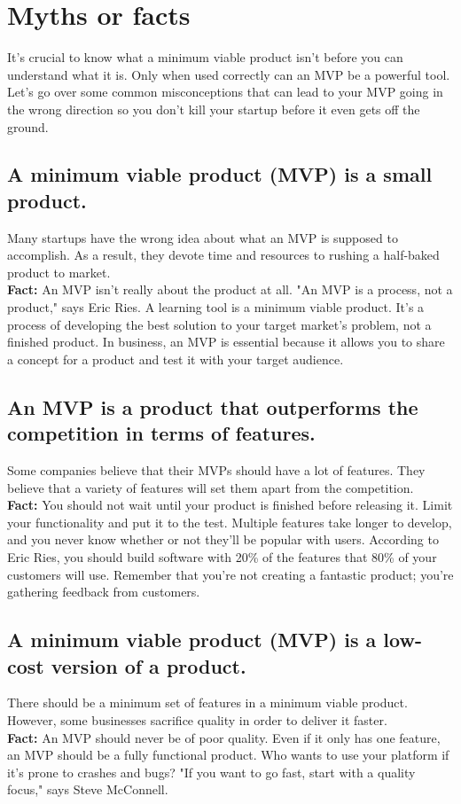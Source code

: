 \documentclass[paper=a4, fontsize=11pt]{scrartcl}
\numberwithin{equation}{section}		%
\numberwithin{figure}{section}			%
\numberwithin{table}{section}				%
\begin{document}
\section{Myths or facts}
It's crucial to know what a minimum viable product isn't before you can understand what it is. Only when used correctly can an MVP be a powerful tool. Let's go over some common misconceptions that can lead to your MVP going in the wrong direction so you don't kill your startup before it even gets off the ground.
\subsection{A minimum viable product (MVP) is a small product.}
Many startups have the wrong idea about what an MVP is supposed to accomplish. As a result, they devote time and resources to rushing a half-baked product to market.\\
\textbf{Fact:} An MVP isn't really about the product at all. "An MVP is a process, not a product," says Eric Ries. A learning tool is a minimum viable product. It's a process of developing the best solution to your target market's problem, not a finished product. In business, an MVP is essential because it allows you to share a concept for a product and test it with your target audience.
\subsection{An MVP is a product that outperforms the competition in terms of features.}
Some companies believe that their MVPs should have a lot of features. They believe that a variety of features will set them apart from the competition.
\\
\textbf{Fact:} You should not wait until your product is finished before releasing it. Limit your functionality and put it to the test. Multiple features take longer to develop, and you never know whether or not they'll be popular with users. According to Eric Ries, you should build software with 20\% of the features that 80\% of your customers will use. Remember that you're not creating a fantastic product; you're gathering feedback from customers.
\subsection{A minimum viable product (MVP) is a low-cost version of a product.}
There should be a minimum set of features in a minimum viable product. However, some businesses sacrifice quality in order to deliver it faster.\\
\textbf{Fact:} An MVP should never be of poor quality. Even if it only has one feature, an MVP should be a fully functional product. Who wants to use your platform if it's prone to crashes and bugs? "If you want to go fast, start with a quality focus," says Steve McConnell.
\end{document}
